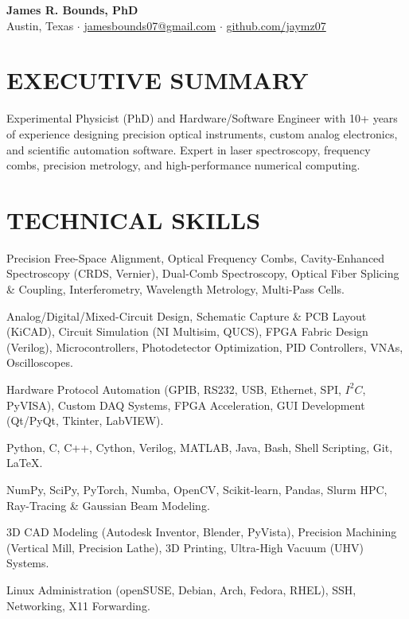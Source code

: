 \documentclass[a4paper,10pt]{extarticle}
\begin{document}
	\pagestyle{empty}
	
	\begin{center}
		{\LARGE \bfseries James R. Bounds, PhD} \\[0.3em]
		Austin, Texas \quad$\cdot$\quad 
		\href{mailto:jamesbounds07@gmail.com}{jamesbounds07@gmail.com} \quad$\cdot$\quad 
		\href{https://github.com/jaymz07}{github.com/jaymz07}
	\end{center}
	
	\section*{EXECUTIVE SUMMARY}
	Experimental Physicist (PhD) and Hardware/Software Engineer with 10+ years of experience designing precision optical instruments, custom analog electronics, and scientific automation software. Expert in laser spectroscopy, frequency combs, precision metrology, and high-performance numerical computing.
	
	\section*{TECHNICAL SKILLS}
	\begin{description}[font=\bfseries, leftmargin=0pt, labelsep=0.5em, itemsep=0.2em]
		\item[Optics \& Photonics:] Precision Free-Space Alignment, Optical Frequency Combs, Cavity-Enhanced Spectroscopy (CRDS, Vernier), Dual-Comb Spectroscopy, Optical Fiber Splicing \& Coupling, Interferometry, Wavelength Metrology, Multi-Pass Cells.
		\item[Hardware, EDA \& Electronics:] Analog/Digital/Mixed-Circuit Design, Schematic Capture \& PCB Layout (KiCAD), Circuit Simulation (NI Multisim, QUCS), FPGA Fabric Design (Verilog), Microcontrollers, Photodetector Optimization, PID Controllers, VNAs, Oscilloscopes.
		\item[Instrumentation \& DAQ:] Hardware Protocol Automation (GPIB, RS232, USB, Ethernet, SPI, $I^2C$, PyVISA), Custom DAQ Systems, FPGA Acceleration, GUI Development (Qt/PyQt, Tkinter, LabVIEW).
		\item[Programming Languages:] Python, C, C++, Cython, Verilog, MATLAB, Java, Bash, Shell Scripting, Git, \LaTeX.
		\item[Scientific Computing \& Modeling:] NumPy, SciPy, PyTorch, Numba, OpenCV, Scikit-learn, Pandas, Slurm HPC, Ray-Tracing \& Gaussian Beam Modeling.
		\item[Mechanical \& CAD/CAM:] 3D CAD Modeling (Autodesk Inventor, Blender, PyVista), Precision Machining (Vertical Mill, Precision Lathe), 3D Printing, Ultra-High Vacuum (UHV) Systems.
		\item[Systems \& Infrastructure:] Linux Administration (openSUSE, Debian, Arch, Fedora, RHEL), SSH, Networking, X11 Forwarding.
	\end{description}
	
\end{document}
